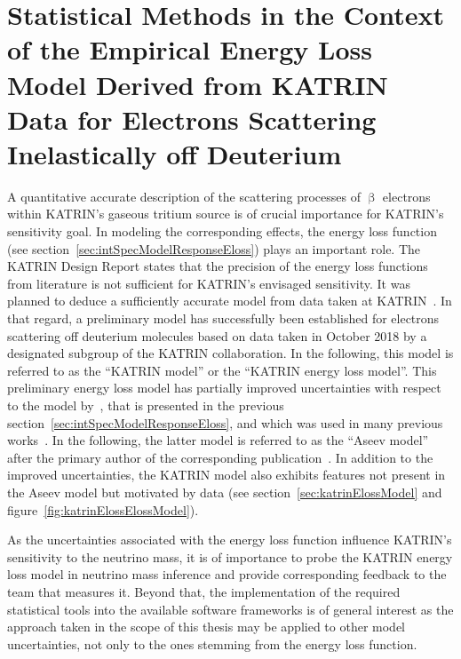 \def\currentRootFolder{chapter/sensitivityStudyWithPreliminaryKatrinElossModel}
\def\currentFigureFolder{\currentRootFolder/fig}

\chapter{Statistical Methods in the Context of the Empirical Energy Loss Model Derived from KATRIN Data for Electrons Scattering Inelastically off Deuterium}
\label{sec:katrinEloss}
A quantitative accurate description of the scattering processes of $\upbeta$ electrons within KATRIN's gaseous tritium source is of crucial importance for KATRIN's sensitivity goal. In modeling the corresponding effects, the energy loss function (see section~\ref{sec:intSpecModelResponseEloss}) plays an important role. The KATRIN Design Report states that the precision of the energy loss functions from literature is not sufficient for KATRIN's envisaged sensitivity. It was planned to deduce a sufficiently accurate model from data taken at KATRIN~\cite{Angrik:2005ep}. In that regard, a preliminary model has successfully been established for electrons scattering off deuterium molecules based on data taken in October 2018 by a designated subgroup of the KATRIN collaboration. In the following, this model is referred to as the ``KATRIN model'' or the ``KATRIN energy loss model''. This preliminary energy loss model has partially improved uncertainties with respect to the model by~\cite{Aseev2000}, that is presented in the previous section~\ref{sec:intSpecModelResponseEloss}, and which was used in many previous works~\cite{Groh2015,Kleesiek2014, Kleesiek2019, SeitzM2019}. In the following, the latter model is referred to as the ``Aseev model'' after the primary author of the corresponding publication~\cite{Aseev2000}. In addition to the improved uncertainties, the KATRIN model also exhibits features not present in the Aseev model but motivated by data (see section~\ref{sec:katrinElossModel} and figure~\ref{fig:katrinElossElossModel}). 

As the uncertainties associated with the energy loss function influence KATRIN's sensitivity to the neutrino mass, it is of importance to probe the KATRIN energy loss model in neutrino mass inference and provide corresponding feedback to the team that measures it. Beyond that, the implementation of the required statistical tools into the available software frameworks is of general interest as the approach taken in the scope of this thesis may be applied to other model uncertainties, not only to the ones stemming from the energy loss function. 

